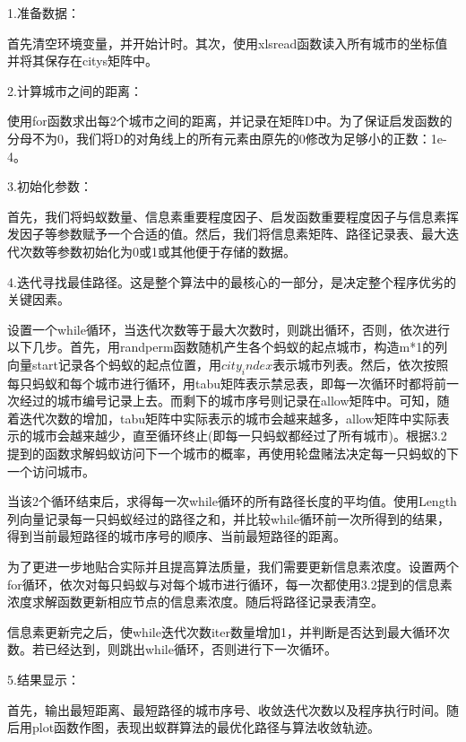 \documentclass[UTF8]{ctexart}
\begin{document}
	1.准备数据：
	
	首先清空环境变量，并开始计时。其次，使用xlsread函数读入所有城市的坐标值并将其保存在citys矩阵中。
	
	
	2.计算城市之间的距离：
	
	使用for函数求出每2个城市之间的距离，并记录在矩阵D中。为了保证启发函数的分母不为0，我们将D的对角线上的所有元素由原先的0修改为足够小的正数：1e-4。
	
	3.初始化参数：
	
	首先，我们将蚂蚁数量、信息素重要程度因子、启发函数重要程度因子与信息素挥发因子等参数赋予一个合适的值。然后，我们将信息素矩阵、路径记录表、最大迭代次数等参数初始化为0或1或其他便于存储的数据。
	
	
	
	4.迭代寻找最佳路径。这是整个算法中的最核心的一部分，是决定整个程序优劣的关键因素。
	
	设置一个while循环，当迭代次数等于最大次数时，则跳出循环，否则，依次进行以下几步。首先，用randperm函数随机产生各个蚂蚁的起点城市，构造m*1的列向量start记录各个蚂蚁的起点位置，用$city_index$表示城市列表。然后，依次按照每只蚂蚁和每个城市进行循环，用tabu矩阵表示禁忌表，即每一次循环时都将前一次经过的城市编号记录上去。而剩下的城市序号则记录在allow矩阵中。可知，随着迭代次数的增加，tabu矩阵中实际表示的城市会越来越多，allow矩阵中实际表示的城市会越来越少，直至循环终止(即每一只蚂蚁都经过了所有城市)。根据3.2提到的函数求解蚂蚁访问下一个城市的概率，再使用轮盘赌法决定每一只蚂蚁的下一个访问城市。
	
	当该2个循环结束后，求得每一次while循环的所有路径长度的平均值。使用Length列向量记录每一只蚂蚁经过的路径之和，并比较while循环前一次所得到的结果，得到当前最短路径的城市序号的顺序、当前最短路径的距离。
	
	为了更进一步地贴合实际并且提高算法质量，我们需要更新信息素浓度。设置两个for循环，依次对每只蚂蚁与对每个城市进行循环，每一次都使用3.2提到的信息素浓度求解函数更新相应节点的信息素浓度。随后将路径记录表清空。
	
	信息素更新完之后，使while迭代次数iter数量增加1，并判断是否达到最大循环次数。若已经达到，则跳出while循环，否则进行下一次循环。
	
	
	
	
	
	
	
	
	5.结果显示：
	
	首先，输出最短距离、最短路径的城市序号、收敛迭代次数以及程序执行时间。随后用plot函数作图，表现出蚁群算法的最优化路径与算法收敛轨迹。
	
	
	
\end{document}
